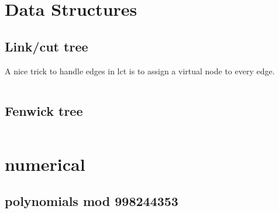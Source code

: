 \documentclass[portrait, 8pt, a4paper, oneside, landscape]{extarticle}
\begin{document}
\thispagestyle{empty}
\begin{figure}[h!]

\end{figure}
\newpage

\twocolumn
\maketitlepage
\newpage

\section{Data Structures}
\subsection{Link/cut tree}
A nice trick to handle edges in lct is to assign a virtual node to every edge.
\inputminted{cpp}{src/lct.cpp}
\subsection{Fenwick tree}
\inputminted{cpp}{src/fenwick2d.cpp}

\section{numerical}
\subsection{polynomials mod 998244353}
\inputminted{cpp}{src/poly_mod.cpp}
\end{document}
